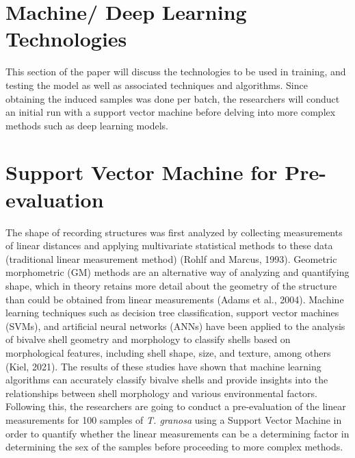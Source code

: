 \section{Machine/ Deep Learning Technologies}
This section of the paper will discuss the technologies to be used in training, and testing the model as well as associated techniques and algorithms.  Since obtaining the induced samples was done per batch, the researchers will conduct an initial run with a support vector machine before delving into more complex methods such as deep learning models. 
\section{Support Vector Machine for Pre-evaluation }
The shape of recording structures was first analyzed by collecting measurements of linear distances and applying multivariate statistical methods to these data (traditional linear measurement method) (Rohlf and Marcus, 1993). Geometric morphometric (GM) methods are an alternative way of analyzing and quantifying shape, which in theory retains more detail about the geometry of the structure than could be obtained from linear measurements (Adams et al., 2004). Machine learning techniques such as decision tree classification, support vector machines (SVMs), and artificial neural networks (ANNs) have been applied to the analysis of bivalve shell geometry and morphology to classify shells based on morphological features, including shell shape, size, and texture, among others (Kiel, 2021). The results of these studies have shown that machine learning algorithms can accurately classify bivalve shells and provide insights into the relationships between shell morphology and various environmental factors.
Following this, the researchers are going to conduct a pre-evaluation of the linear measurements for 100 samples of \textit{T. granosa} using a Support Vector Machine in order to quantify whether the linear measurements can be a determining factor in determining the sex of the samples before proceeding to more complex methods. 
